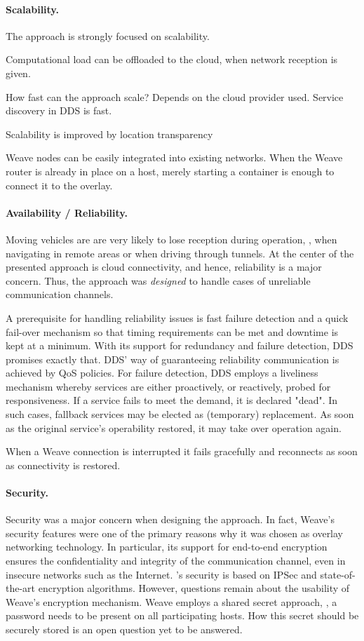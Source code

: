 \paragraph{Scalability.}
The approach is strongly focused on scalability. 

Computational load can be offloaded to the cloud, when network reception is given.

How fast can the approach scale? Depends on the cloud provider used. Service discovery in DDS is fast.

Scalability is improved by location transparency

Weave nodes can be easily integrated into existing networks. When the Weave router is already in place on a host, merely starting a container is enough to connect it to the overlay.



\paragraph{Availability / Reliability.}
Moving vehicles are are very likely to lose reception during operation, \eg , when navigating in remote areas or when driving through tunnels. At the center of the presented approach is cloud connectivity, and hence, reliability is a major concern. Thus, the approach was \emph{designed} to handle cases of unreliable communication channels.

A prerequisite for handling reliability issues is fast failure detection and a quick fail-over mechanism so that timing requirements can be met and downtime is kept at a minimum. With its support for redundancy and failure detection, DDS promises exactly that. DDS' way of guaranteeing reliability communication is achieved by QoS policies. For failure detection, DDS employs a liveliness mechanism whereby services are either proactively, or reactively, probed for responsiveness. If a service fails to meet the demand, it is declared "dead". In such cases, fallback services may be elected as (temporary) replacement. As soon as the original service's operability restored, it may take over operation again.

\wnet 

When a Weave connection is interrupted it fails gracefully and reconnects as soon as connectivity is restored.

\paragraph{Security.}
Security was a major concern when designing the approach. In fact, Weave's security features were one of the primary reasons why it was chosen as overlay networking technology. In particular, its support for end-to-end encryption ensures the confidentiality and integrity of the communication channel, even in insecure networks such as the Internet. \wnet 's security is based on IPSec and state-of-the-art encryption algorithms. However, questions remain about the usability of Weave's encryption mechanism. Weave employs a shared secret approach, \ie , a password needs to be present on all participating hosts. How this secret should be securely stored is an open question yet to be answered.

